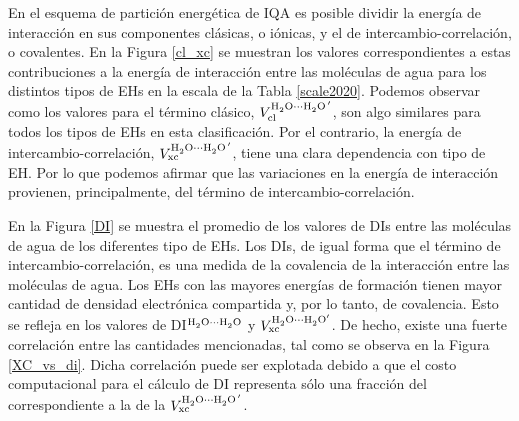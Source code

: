 En el esquema de partición energética de IQA es posible dividir la energía de
interacción en sus componentes clásicas, o iónicas, y el de
intercambio-correlación, o covalentes. En la Figura \ref{cl_xc} se muestran los
valores correspondientes a estas contribuciones a la energía de interacción
entre las moléculas de agua para los distintos tipos de EHs en la escala de la
Tabla \ref{scale2020}. Podemos observar como los valores para el término
clásico, $V_{\mathrm{cl}}^{\ce{H2O}\cdots\ce{H2O}^{ \, \prime}}$, son algo
similares para todos los tipos de EHs en esta clasificación. Por el contrario,
la energía de intercambio-correlación,
$V_{\mathrm{xc}}^{\ce{H2O}\cdots\ce{H2O}^{ \, \prime}}$, tiene una clara
dependencia con tipo de EH.  Por lo que podemos afirmar que las variaciones en
la energía de interacción provienen, principalmente, del término de
intercambio-correlación.


En la Figura \ref{DI} se muestra el promedio de los valores de DIs entre las
moléculas de agua de los diferentes tipo de EHs. Los DIs, de igual forma que el
término de intercambio-correlación, es una medida de la covalencia de la
interacción entre las moléculas de agua. Los EHs con las mayores energías de
formación tienen mayor cantidad de densidad electrónica compartida y, por lo
tanto, de covalencia.  Esto se refleja en los valores de
DI$^{\ce{H2O\bond{...}H2O}}$ y
$V_{\mathrm{xc}}^{\ce{H2O\bond{...}H2O^{\prime}}}$. De hecho, existe una fuerte
correlación entre las cantidades mencionadas, tal como se observa en la Figura
\ref{XC_vs_di}. Dicha correlación puede ser explotada debido a que el costo
computacional para el cálculo de DI representa sólo una fracción del
correspondiente a la de la $V_{\mathrm{xc}}^{\ce{H2O}\cdots\ce{H2O}^{ \,
\prime}}$.

